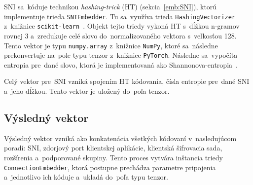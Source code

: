 SNI sa~kóduje technikou \textit{hashing-trick} (HT) (sekcia~\ref{emb:SNI}), ktorú implementuje trieda \texttt{SNIEmbedder}. Tu sa~využíva trieda \texttt{HashingVectorizer} z~knižnice \texttt{scikit-learn}~\cite{scikit}. Objekt tejto triedy vykoná HT s~dĺžkou n-gramov rovnej 3 a~zredukuje celé slovo do~normalizovaného vektora s~veľkosťou 128. Tento vektor je typu \texttt{numpy.array} z~knižnice \texttt{NumPy}, ktoré sa~následne prekonvertuje na~pole typu tenzor z~knižnice \texttt{PyTorch}. Následne sa~vypočíta entropia pre~dané slovo, ktorá je implementovaná ako Shannonova-entropia~\cite{ShannonEntropy}. 

Celý vektor pre~SNI vzniká spojením HT kódovania, čísla entropie pre~dané SNI a~jeho dĺžkou. Tento vektor je uložený do~poľa tenzor.

\subsection{Výsledný vektor}
Výsledný vektor vzniká ako konkatenácia všetkých kódovaní v~nasledujúcom poradí: SNI, zdorjový port klientskej aplikácie, klientská šifrovacia sada, rozšírenia a~podporované skupiny. Tento proces vytvára inštancia triedy \texttt{ConnectionEmbedder}, ktorá postupne prechádza parametre pripojenia a~jednotlivo ich kóduje a~ukladá do~poľa typu tenzor.

